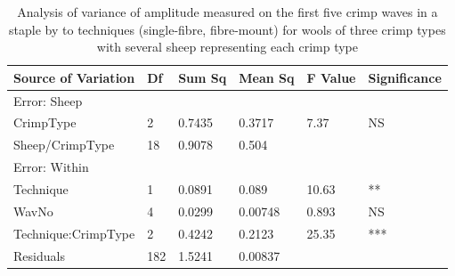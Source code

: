 %

\begin{table}[htp]
\centering
\caption{Analysis of variance of amplitude measured on the first five crimp waves in a staple by to techniques (single-fibre, fibre-mount) for wools of three crimp types with several sheep representing each crimp type}
\label{tab:ampl5}
\vspace{0.1in}
\begin{tabular}{|p{1.3in}|p{0.4in}|p{0.4in}|p{0.4in}|p{0.4in}|p{0.8in}|} \hline
     Source of Variation & Df & Sum Sq  & Mean Sq  & F Value  & Significance  \\  \hline
 Error: Sheep & & & & & \\
 CrimpType & 2 & 0.7435 & 0.3717 & 7.37 & NS  \\
 Sheep/CrimpType & 18 & 0.9078 & 0.504 &  &  \\ 
 Error: Within & & & & & \\
 Technique & 1 & 0.0891 & 0.089 & 10.63  & **  \\
 WavNo & 4 & 0.0299 & 0.00748 & 0.893 & NS \\
 Technique:CrimpType & 2 & 0.4242 & 0.2123 & 25.35 & *** \\
 Residuals & 182 & 1.5241 & 0.00837 & & \\ \hline
\end{tabular}
\end{table}

%
